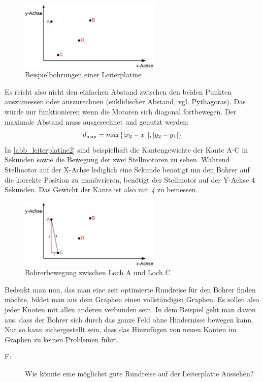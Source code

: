 \documentclass{article}
\begin{document}
\begin{figure}[H]
	\centering
	\includegraphics[width=0.6\textwidth]{leiterplatine.jpg}
	\caption{Beispielbohrungen einer Leiterplatine}
	\label{abb_leiterplatine}
\end{figure}

Es reicht also nicht den einfachen Abstand zwischen den beiden Punkten auszumessen oder auszurechnen (euklidischer Abstand, vgl. Pythagoras). Das würde nur funktionieren wenn die Motoren sich diagonal fortbewegen. Der maximale Abstand muss ausgerechnet und genutzt werden:
\[d\textsubscript{max} = max\{ |x\textsubscript{2} - x\textsubscript{1}| , |y\textsubscript{2} - y\textsubscript{1}|\} \]
In \autoref{abb_leiterplatine2} sind beispielhaft die Kantengewichte der Kante A-C in Sekunden sowie die Bewegung der zwei Stellmotoren zu sehen. Während Stellmotor auf der X-Achse lediglich eine Sekunde benötigt um den Bohrer auf die korrekte Position zu manövrieren, benötigt der Stellmotor auf der Y-Achse 4 Sekunden. Das Gewicht der Kante ist also mit \textit{4} zu bemessen.

\begin{figure}[H]
	\centering
	\includegraphics[width=0.6\textwidth]{leiterplatine2.jpg}
	\caption{Bohrerbewegung zwischen Loch A und Loch C}
	\label{abb_leiterplatine2}
\end{figure}

Bedenkt man nun, das man eine zeit optimierte Rundreise für den Bohrer finden möchte, bildet man aus dem Graphen einen vollständigen Graphen. Es sollen also jeder Knoten mit allen anderen verbunden sein. In dem Beispiel geht man davon aus, dass der Bohrer sich durch das ganze Feld ohne Hindernisse bewegen kann. Nur so kann sichergestellt sein, dass das Hinzufügen von neuen Kanten im Graphen zu keinen Problemen führt.
\\
\begin{description}
	\item[F:] Wie könnte eine möglichst gute Rundreise auf der Leiterplatte Aussehen?
\end{description}
\end{document}
